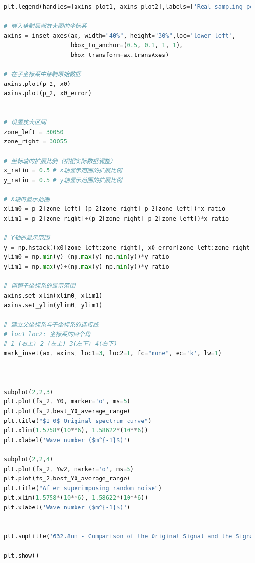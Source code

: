 \documentclass[conference]{IEEEtran}
\begin{document}
\begin{lstlisting}[language=python]
plt.legend(handles=[axins_plot1, axins_plot2],labels=['Real sampling points', 'After imposing random noise'], loc='upper left')

# 嵌入绘制局部放大图的坐标系
axins = inset_axes(ax, width="40%", height="30%",loc='lower left',
                   bbox_to_anchor=(0.5, 0.1, 1, 1),
                   bbox_transform=ax.transAxes)

# 在子坐标系中绘制原始数据
axins.plot(p_2, x0)
axins.plot(p_2, x0_error)


# 设置放大区间
zone_left = 30050
zone_right = 30055

# 坐标轴的扩展比例（根据实际数据调整）
x_ratio = 0.5 # x轴显示范围的扩展比例
y_ratio = 0.5 # y轴显示范围的扩展比例

# X轴的显示范围
xlim0 = p_2[zone_left]-(p_2[zone_right]-p_2[zone_left])*x_ratio
xlim1 = p_2[zone_right]+(p_2[zone_right]-p_2[zone_left])*x_ratio

# Y轴的显示范围
y = np.hstack((x0[zone_left:zone_right], x0_error[zone_left:zone_right]))
ylim0 = np.min(y)-(np.max(y)-np.min(y))*y_ratio
ylim1 = np.max(y)+(np.max(y)-np.min(y))*y_ratio

# 调整子坐标系的显示范围
axins.set_xlim(xlim0, xlim1)
axins.set_ylim(ylim0, ylim1)

# 建立父坐标系与子坐标系的连接线
# loc1 loc2: 坐标系的四个角
# 1 (右上) 2 (左上) 3(左下) 4(右下)
mark_inset(ax, axins, loc1=3, loc2=1, fc="none", ec='k', lw=1)



subplot(2,2,3)
plt.plot(fs_2, Y0, marker='o', ms=5)
plt.plot(fs_2,best_Y0_average_range)
plt.title("$I_0$ Original spectrum curve")
plt.xlim(1.5758*(10**6), 1.58622*(10**6))
plt.xlabel('Wave number ($m^{-1}$)')

subplot(2,2,4)
plt.plot(fs_2, Yw2, marker='o', ms=5)
plt.plot(fs_2,best_Y0_average_range)
plt.title("After superimposing random noise")
plt.xlim(1.5758*(10**6), 1.58622*(10**6))
plt.xlabel('Wave number ($m^{-1}$)')


plt.suptitle("632.8nm - Comparison of the Original Signal and the Signal after Adding Random Noise", fontsize = 20)

plt.show()

\end{lstlisting}
\end{document}
